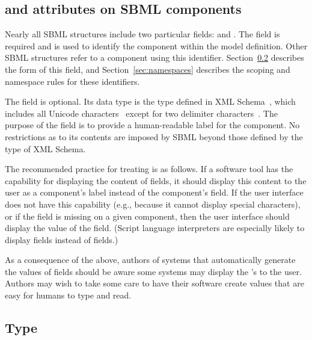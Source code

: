 \documentclass[10pt,twocolumntoc]{cekarticle}
\begin{document}
\subsection{ and  attributes on SBML components}
\label{sec:idnameattribs}

Nearly all SBML structures include two particular fields:  and
.  The  field is required and is used to identify
the component within the model definition.  Other SBML structures refer to
a component using this identifier.  Section~\ref{sec:id} describes the form
of this field, and Section~\ref{sec:namespaces} describes the scoping and
namespace rules for these identifiers.

The  field is optional.  Its data type is the type
 defined in XML Schema~\citep{biron:2000,thompson:2000},
which includes all Unicode characters~\citep{unicode:1996} except for two
delimiter characters~\citep{biron:2000}.  The purpose of the 
field is to provide a human-readable label for the component.  No
restrictions as to its contents are imposed by SBML beyond those defined by
the  type of XML Schema.

The recommended practice for treating  is as follows.  If a
software tool has the capability for displaying the content of
 fields, it should display this content to the user as a
component's label instead of the component's  field.  If the
user interface does not have this capability (e.g., because it cannot
display special characters), or if the  field is missing on a
given component, then the user interface should display the value of the
 field.  (Script language interpreters are especially likely to
display  fields instead of  fields.)

As a consequence of the above, authors of systems that automatically
generate the values of  fields should be aware some systems may
display the 's to the user.  Authors may wish to take some care
to have their software create  values that are easy for humans
to type and read.


\subsection{Type }
\label{sec:id}
\end{document}
